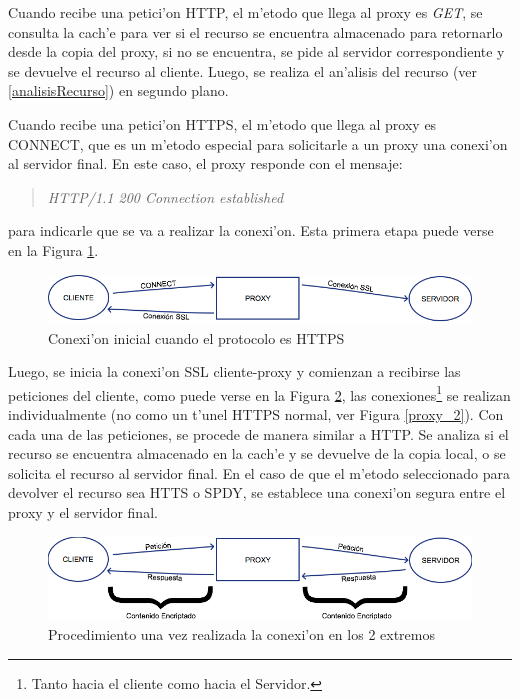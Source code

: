 Cuando recibe una petici'on HTTP, el m'etodo que llega al proxy es \textit{GET}, se consulta la cach'e para ver si el recurso se encuentra almacenado para retornarlo desde la copia del proxy, si no se encuentra, se pide al servidor correspondiente y se devuelve el recurso al cliente. Luego, se realiza el an'alisis del recurso (ver \ref{analisisRecurso}) en segundo plano.

Cuando recibe una petici'on HTTPS, el m'etodo que llega al proxy es CONNECT, que es un m'etodo especial para solicitarle a un proxy una conexi'on al servidor final. En este caso, el proxy responde con el mensaje:
\begin{quote}
\textit{\textit{HTTP/1.1 200 Connection established}}
\end{quote}
para indicarle que se va a realizar la conexi'on. Esta primera etapa puede verse en la Figura \ref{mitm1}.

\begin{figure}[h]
  	\centering
	\includegraphics[width=\textwidth]{img/mitm1}
	\caption{\small Conexi'on inicial cuando el protocolo es HTTPS}
	\label{mitm1}
\end{figure}
\vspace{3cm}
Luego, se inicia la conexi'on SSL cliente-proxy y comienzan a recibirse las peticiones del cliente, como puede verse en la Figura \ref{mitm2}, las conexiones\footnote{Tanto hacia el cliente como hacia el Servidor.} se realizan individualmente (no como un t'unel HTTPS normal, ver Figura \ref{proxy_2}). Con cada una de las peticiones, se procede de manera similar a HTTP. Se analiza si el recurso se encuentra almacenado en la cach'e y se devuelve de la copia local, o se solicita el recurso al servidor final. En el caso de que el m'etodo seleccionado para devolver el recurso sea HTTS o SPDY, se establece una conexi'on segura entre el proxy y el servidor final.

\begin{figure}[h]
  	\centering
	\includegraphics[width=\textwidth]{img/mitm2}
	\caption{\small Procedimiento una vez realizada la conexi'on en los 2 extremos}
	\label{mitm2}
\end{figure}

